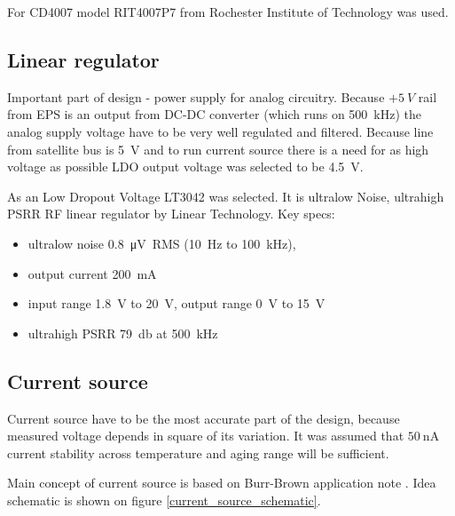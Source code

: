         For CD4007 model RIT4007P7 from Rochester Institute of Technology \cite{RIT_FULLER} was used.

    \subsection{Linear regulator}
        Important part of design - power supply for analog circuitry. Because $+\SI{5}{V}$ rail from EPS is an output from DC-DC converter (which runs on \SI{500}{\kilo\hertz}) the analog supply voltage have to be very well regulated and filtered. Because line from satellite bus is \SI{5}{\volt} and to run current source there is a need for as high voltage as possible LDO output voltage was selected to be \SI{4.5}{\volt}.

        As an Low Dropout Voltage LT3042 was selected. It is ultralow Noise, ultrahigh PSRR RF linear regulator by Linear Technology. Key specs:
        \begin{itemize}
            \item ultralow noise \SI{0.8}{\micro\volt RMS} (\SI{10}{\hertz} to \SI{100}{\kilo\hertz}),
            \item output current \SI{200}{\milli\ampere}
            \item input range \SI{1.8}{\volt} to \SI{20}{\volt}, output range \SI{0}{\volt} to \SI{15}{\volt}
            \item ultrahigh PSRR \SI{79}{\decibel} at \SI{500}{\kilo\hertz}
        \end{itemize}

    \subsection{Current source}
        Current source have to be the most accurate part of the design, because measured voltage depends in square of its variation. It was assumed that $\SI{50}{\nano\ampere}$ current stability across temperature and aging range will be sufficient.

        Main concept of current source is based on Burr-Brown application note \cite{Make_a_precision_current_source_or_sink}. Idea schematic is shown on figure \ref{current_source_schematic}.

